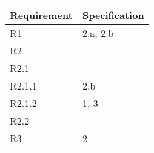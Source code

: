 \begin{table}[h]
\begin{tabular}{|l|l|}
\hline
Requirement & Specification \\ \hline
R1          & 2.a, 2.b      \\ \hline
R2          &               \\ \hline
R2.1        &               \\ \hline
R2.1.1      & 2.b           \\ \hline
R2.1.2      & 1, 3          \\ \hline
R2.2        &               \\ \hline
R3          & 2             \\ \hline
\end{tabular}
\end{table}
